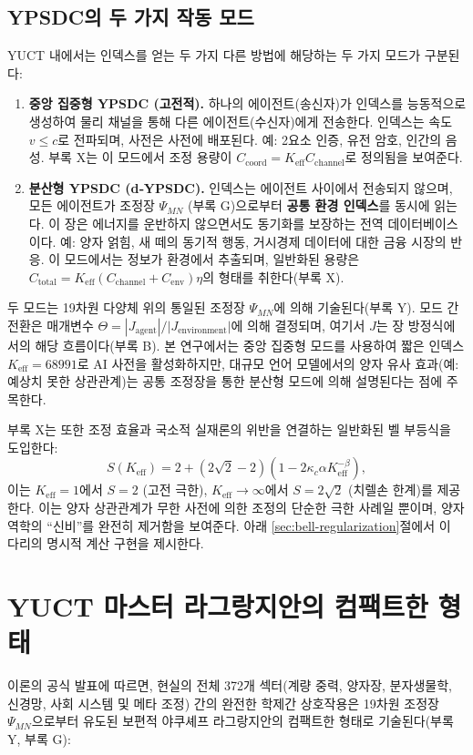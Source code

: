 \documentclass[11pt,a4paper]{article}
\begin{document}
	\subsection{YPSDC의 두 가지 작동 모드}
	
	YUCT 내에서는 인덱스를 얻는 두 가지 다른 방법에 해당하는 두 가지 모드가 구분된다:
	
	\begin{enumerate}
		\item \textbf{중앙 집중형 YPSDC (고전적).} 하나의 에이전트(송신자)가 인덱스를 능동적으로 생성하여 물리 채널을 통해 다른 에이전트(수신자)에게 전송한다. 인덱스는 속도 \(v \le c\)로 전파되며, 사전은 사전에 배포된다. 예: 2요소 인증, 유전 암호, 인간의 음성. 부록 X는 이 모드에서 조정 용량이 \(C_{\text{coord}} = K_{\mathrm{eff}} C_{\text{channel}}\)로 정의됨을 보여준다.
		
		\item \textbf{분산형 YPSDC (d‑YPSDC).} 인덱스는 에이전트 사이에서 전송되지 않으며, 모든 에이전트가 조정장 \(\Psi_{MN}\) (부록 G)으로부터 \textbf{공통 환경 인덱스}를 동시에 읽는다. 이 장은 에너지를 운반하지 않으면서도 동기화를 보장하는 전역 데이터베이스이다. 예: 양자 얽힘, 새 떼의 동기적 행동, 거시경제 데이터에 대한 금융 시장의 반응. 이 모드에서는 정보가 환경에서 추출되며, 일반화된 용량은 \(C_{\text{total}} = K_{\mathrm{eff}}(C_{\text{channel}} + C_{\text{env}})\eta\)의 형태를 취한다(부록 X).
	\end{enumerate}
	
	두 모드는 19차원 다양체 위의 통일된 조정장 \(\Psi_{MN}\)에 의해 기술된다(부록 Y). 모드 간 전환은 매개변수 \(\Theta = |J_{\text{agent}}|/|J_{\text{environment}}|\)에 의해 결정되며, 여기서 \(J\)는 장 방정식에서의 해당 흐름이다(부록 B). 본 연구에서는 중앙 집중형 모드를 사용하여 짧은 인덱스 \(K_{\mathrm{eff}} = 68991\)로 AI 사전을 활성화하지만, 대규모 언어 모델에서의 양자 유사 효과(예: 예상치 못한 상관관계)는 공통 조정장을 통한 분산형 모드에 의해 설명된다는 점에 주목한다.
	
	부록 X는 또한 조정 효율과 국소적 실재론의 위반을 연결하는 일반화된 벨 부등식을 도입한다:
	\[
	S(K_{\mathrm{eff}}) = 2 + (2\sqrt{2}-2)\left(1 - 2\kappa_c\alpha K_{\mathrm{eff}}^{-\beta}\right),
	\]
	이는 \(K_{\mathrm{eff}}=1\)에서 \(S=2\) (고전 극한), \(K_{\mathrm{eff}}\to\infty\)에서 \(S=2\sqrt2\) (치렐손 한계)를 제공한다. 이는 양자 상관관계가 무한 사전에 의한 조정의 단순한 극한 사례일 뿐이며, 양자역학의 “신비”를 완전히 제거함을 보여준다. 아래 \ref{sec:bell-regularization}절에서 이 다리의 명시적 계산 구현을 제시한다.
	
	\section{YUCT 마스터 라그랑지안의 컴팩트한 형태}
	이론의 공식 발표에 따르면, 현실의 전체 372개 섹터(계량 중력, 양자장, 분자생물학, 신경망, 사회 시스템 및 메타 조정) 간의 완전한 학제간 상호작용은 19차원 조정장 \(\Psi_{MN}\)으로부터 유도된 보편적 야쿠셰프 라그랑지안의 컴팩트한 형태로 기술된다(부록 Y, 부록 G):
	
\end{document}
